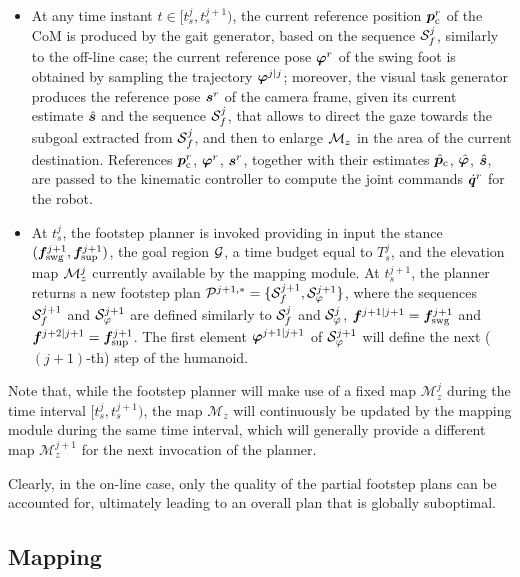 \begin{itemize}
    \item At any time instant $t \in [t_s^j, t_s^{j+1})$, the current reference position ${\bm{p}}_{\rm c}^r$ of the CoM is produced by the gait generator, based on the sequence ${\cal S}_f^j$, similarly to the off-line case; the current reference pose ${\bm{\varphi}}^r$ of the swing foot is obtained by sampling the trajectory ${\bm{\varphi}}^{j|j}$; moreover, the visual task generator produces the reference pose ${\bm{s}}^r$ of the camera frame, given its current estimate $\hat{{\bm{s}}}$ and the sequence ${\cal S}_f^j$, that allows to direct the gaze towards the subgoal extracted from ${\cal S}_f^j$, and then to enlarge ${\cal M}_z$ in the area of the current destination. 
    References ${\bm{p}}_{\rm c}^r$, ${\bm{\varphi}}^r$, ${\bm{s}}^r$, together with their estimates $\hat{{\bm{p}}}_{\rm c}$, $\hat{{\bm{\varphi}}}$, $\hat{{\bm{s}}}$, are passed to the kinematic controller to compute the joint commands $\dot{{\bm{q}}}^r$ for the robot.
    \item At $t_s^j$, the footstep planner is invoked providing in input the stance $({\bm{f}}_{\rm swg}^{j+1}, {\bm{f}}_{\rm sup}^{j+1})$, the goal region $\cal G$, a time budget equal to $T_s^j$, and the elevation map ${\cal M}_z^j$ currently available by the mapping module.
    At $t_s^{j+1}$, the planner returns a new footstep plan ${\cal P}^{j+1,*} = \{ {\cal S}_f^{j+1}, {\cal S}_\varphi^{j+1}\}$, where the sequences ${\cal S}_f^{j+1}$ and ${\cal S}_\varphi^{j+1}$ are defined similarly to ${\cal S}_f^{j}$ and ${\cal S}_\varphi^{j}$, ${\bm{f}}^{j+1|j+1} = {\bm{f}}_{\rm swg}^{j+1}$ and ${\bm{f}}^{j+2|j+1} = {\bm{f}}_{\rm sup}^{j+1}$. 
    The first element ${\bm{\varphi}}^{j+1|j+1}$ of ${\cal S}_\varphi^{j+1}$ will define the next ($(j+1)$-th) step of the humanoid. 
\end{itemize}

Note that, while the footstep planner will make use of a fixed map $\mathcal{M}_z^j$ during the time interval $[t_s^j, t_s^{j+1})$, the map $\mathcal{M}_z$ will continuously be updated by the mapping module during the same time interval, which will generally provide a different map $\mathcal{M}_z^{j+1}$ for the next invocation of the planner.

Clearly, in the on-line case, only the quality of the partial footstep plans can be accounted for, ultimately leading to an overall plan that is globally suboptimal. 

\subsection{Mapping}
\label{sec:WoS:onlineCase:MappingModule}

